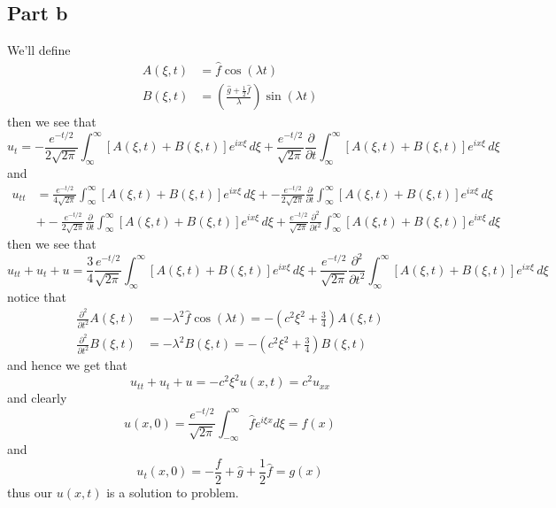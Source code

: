 \documentclass[12pt]{report}
\begin{document}
\subsection*{Part b}
We'll define
\begin{align*}
    A(\xi,t) &= \hat{f}\cos(\lambda t) \\
    B(\xi,t) &=  \left( \frac{\hat{g} + \frac{1}{2}\hat{f}}{\lambda}\right)\sin(\lambda t)
\end{align*}
then we see that
\begin{equation*}
    u_t = -\frac{e^{-t/2}}{2\sqrt{2\pi}} \int_{\infty}^\infty \left[A(\xi,t) + B(\xi,t)\right]e^{ix\xi} \, d\xi + \frac{e^{-t/2}}{\sqrt{2\pi}} \frac{\partial}{\partial t}\int_{\infty}^\infty \left[A(\xi,t) + B(\xi,t)\right]e^{ix\xi} \, d\xi
\end{equation*}
and 
\begin{align*}
    u_{tt} &= \frac{e^{-t/2}}{4\sqrt{2\pi}} \int_{\infty}^\infty \left[A(\xi,t) + B(\xi,t)\right]e^{ix\xi} \, d\xi + -\frac{e^{-t/2}}{2\sqrt{2\pi}} \frac{\partial }{\partial t}\int_{\infty}^\infty \left[A(\xi,t) + B(\xi,t)\right]e^{ix\xi} \, d\xi \\
    &+ -\frac{e^{-t/2}}{2\sqrt{2\pi}} \frac{\partial}{\partial t}\int_{\infty}^\infty \left[A(\xi,t) + B(\xi,t)\right]e^{ix\xi} \, d\xi + \frac{e^{-t/2}}{\sqrt{2\pi}} \frac{\partial^2}{\partial t^2}\int_{\infty}^\infty \left[A(\xi,t) + B(\xi,t)\right]e^{ix\xi} \, d\xi
\end{align*}
then we see that
\begin{equation*}
    u_{tt} + u_t + u =  \frac{3}{4}\frac{e^{-t/2}}{\sqrt{2\pi}} \int_{\infty}^\infty \left[A(\xi,t) + B(\xi,t)\right]e^{ix\xi} \, d\xi + \frac{e^{-t/2}}{\sqrt{2\pi}} \frac{\partial^2}{\partial t^2}\int_{\infty}^\infty \left[A(\xi,t) + B(\xi,t)\right]e^{ix\xi} \, d\xi
\end{equation*}
notice that
\begin{align*}
    \frac{\partial^2}{\partial t^2} A(\xi,t) &= -\lambda^2 \hat{f} \cos(\lambda t) = -\left(c^2\xi^2 + \frac{3}{4}\right)A(\xi,t) \\
    \frac{\partial^2}{\partial t^2} B(\xi,t) &= -\lambda^2 B(\xi,t) = -\left(c^2\xi^2 + \frac{3}{4}\right)B(\xi,t)
\end{align*}
and hence we get that
\begin{equation*}
    u_{tt} + u_{t} + u = -c^2\xi^2 u(x,t) = c^2u_{xx}
\end{equation*}
and clearly
\begin{equation*}
    u(x,0) = \frac{e^{-t/2}}{\sqrt{2\pi}} \int_{-\infty}^\infty \hat{f} e^{i\xi x} d\xi = f(x) 
\end{equation*}
and
\begin{equation*}
    u_t(x,0) = -\frac{f}{2} + \hat{g} + \frac{1}{2}\hat{f} = g(x)
\end{equation*}
thus our $u(x,t)$ is a solution to problem.
\end{document}
